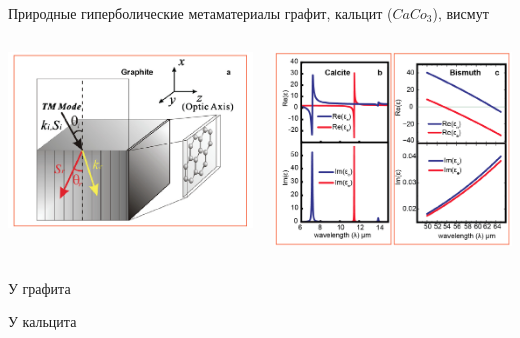 \documentclass[9pt, compress, xcolor=table]{beamer}
\begin{document}
\begin{frame}{Природные гиперболические метаматериалы}
графит, кальцит ($CaCo_3$), висмут
\begin{columns}[c]
\column{2.0in}
\begin{center}
\includegraphics[width=\textwidth]{neg_ref_n14}
\end{center}
\column{2.0in}
\begin{center}
\includegraphics[width=\textwidth]{neg_ref_n16}
\end{center}
\end{columns}
У графита

 У кальцита

\end{frame}
\end{document}
